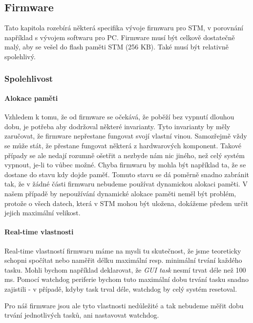 
\subsection{Firmware}

Tato kapitola rozebírá některá specifika vývoje firmwaru pro STM, v porovnání například s vývojem
softwaru pro PC.
Firmware musí být celkově dostatečně malý, aby se vešel do flash paměti STM (256 KB).
Také musí být relativně spolehlivý.

\subsubsection{Spolehlivost}

\paragraph{Alokace paměti}
Vzhledem k tomu, že od firmware se očekává, že poběží bez vypnutí dlouhou dobu, je potřeba aby
dodržoval některé invarianty.
Tyto invarianty by měly zaručovat, že firmware nepřestane fungovat svojí vlastní vinou.
Samozřejmě vždy se může stát, že přestane fungovat některá z hardwarových komponent.
Takové případy se ale nedají rozumně ošetřit a nezbyde nám nic jiného, než celý systém vypnout,
je-li to vůbec možné.
Chyba firmwaru by mohla být například ta, že se dostane do stavu kdy dojde paměť.
Tomuto stavu se dá poměrně snadno zabránit tak, že v žádné části firmwaru nebudeme používat
dynamickou alokaci paměti.
V našem případě by nepoužívání dynamické alokace paměti neměl být problém, protože o všech datech,
která v STM mohou být uložena, dokážeme předem určit jejich maximální velikost.

\paragraph{Real-time vlastnosti}
Real-time vlastností firmwaru máme na mysli tu skutečnost, že jsme teoreticky schopni spočítat nebo
naměřit délku maximální resp. minimální trvání každého tasku.
Mohli bychom například deklarovat, že \emph{GUI task} nesmí trvat déle než
100 ms.
Pomocí watchdog \cite{ReferenceManual} periferie bychom tuto maximální dobu trvání tasku snadno zajistili - v
případě, kdyby task trval déle, watchdog by celý systém resetoval.

Pro náš firmware jsou ale tyto vlastnosti nedůležité a tak nebudeme měřit dobu trvání jednotlivých
tasků, ani nastavovat watchdog.


